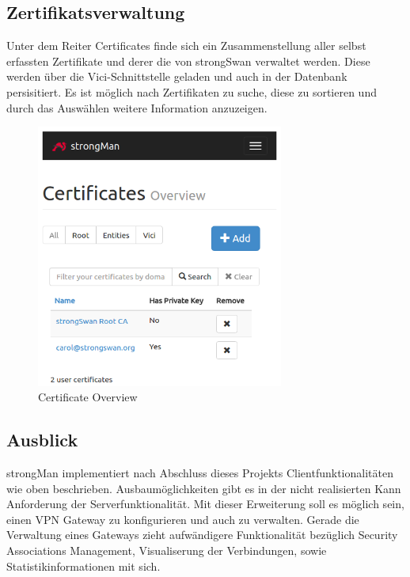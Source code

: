 \noindent\begin{minipage}[t]{0.5\textwidth}
\vspace{0pt}
\subsection{Zertifikatsverwaltung}
Unter dem Reiter Certificates finde sich ein Zusammenstellung aller selbst erfassten Zertifikate und derer die von strongSwan verwaltet werden. Diese werden über die Vici-Schnittstelle geladen und auch in der Datenbank persisitiert. Es ist möglich nach Zertifikaten zu suche, diese zu sortieren und durch das Auswählen weitere Information anzuzeigen.
\end{minipage}
\hfill
\begin{minipage}[t]{0.5\textwidth}
\vspace{0pt}
    \begin{figure}[H]
    	\centering
    	\includegraphics[width=230pt]{images/certificate_overview.png}
    	\caption{Certificate Overview}
    \end{figure}
\end{minipage}
\newpage

\subsection{Ausblick}
strongMan implementiert nach Abschluss dieses Projekts Clientfunktionalitäten wie oben beschrieben. Ausbaumöglichkeiten gibt es in der nicht realisierten Kann Anforderung der Serverfunktionalität. Mit dieser Erweiterung soll es möglich sein, einen VPN Gateway zu konfigurieren und auch zu verwalten. Gerade die Verwaltung eines Gateways zieht aufwändigere Funktionalität bezüglich Security Associations Management, Visualiserung der Verbindungen, sowie Statistikinformationen mit sich.\\ 


